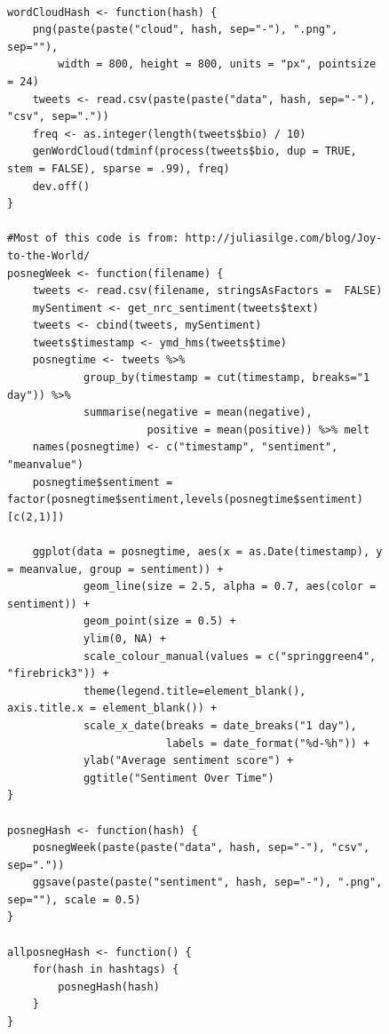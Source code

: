 \documentclass[prodmode]{acmsmall} %
\begin{document}
\begin{figure}[!t]
    \begin{lstlisting}

wordCloudHash <- function(hash) {
	png(paste(paste("cloud", hash, sep="-"), ".png", sep=""), 
		width = 800, height = 800, units = "px", pointsize = 24)
	tweets <- read.csv(paste(paste("data", hash, sep="-"), "csv", sep="."))
	freq <- as.integer(length(tweets$bio) / 10)
	genWordCloud(tdminf(process(tweets$bio, dup = TRUE, stem = FALSE), sparse = .99), freq)
	dev.off()
}

#Most of this code is from: http://juliasilge.com/blog/Joy-to-the-World/
posnegWeek <- function(filename) {
	tweets <- read.csv(filename, stringsAsFactors =  FALSE)
	mySentiment <- get_nrc_sentiment(tweets$text)
	tweets <- cbind(tweets, mySentiment)
	tweets$timestamp <- ymd_hms(tweets$time)
	posnegtime <- tweets %>% 
	        group_by(timestamp = cut(timestamp, breaks="1 day")) %>%
	        summarise(negative = mean(negative),
	                  positive = mean(positive)) %>% melt
	names(posnegtime) <- c("timestamp", "sentiment", "meanvalue")
	posnegtime$sentiment = factor(posnegtime$sentiment,levels(posnegtime$sentiment)[c(2,1)])

	ggplot(data = posnegtime, aes(x = as.Date(timestamp), y = meanvalue, group = sentiment)) +
	        geom_line(size = 2.5, alpha = 0.7, aes(color = sentiment)) +
	        geom_point(size = 0.5) +
	        ylim(0, NA) + 
	        scale_colour_manual(values = c("springgreen4", "firebrick3")) +
	        theme(legend.title=element_blank(), axis.title.x = element_blank()) +
	        scale_x_date(breaks = date_breaks("1 day"), 
	                     labels = date_format("%d-%h")) +
	        ylab("Average sentiment score") + 
	        ggtitle("Sentiment Over Time")
}

posnegHash <- function(hash) {
	posnegWeek(paste(paste("data", hash, sep="-"), "csv", sep="."))
	ggsave(paste(paste("sentiment", hash, sep="-"), ".png", sep=""), scale = 0.5)
}

allposnegHash <- function() {
	for(hash in hashtags) {
		posnegHash(hash)
	}
}

\end{lstlisting}
  \end{figure}
\end{document}
